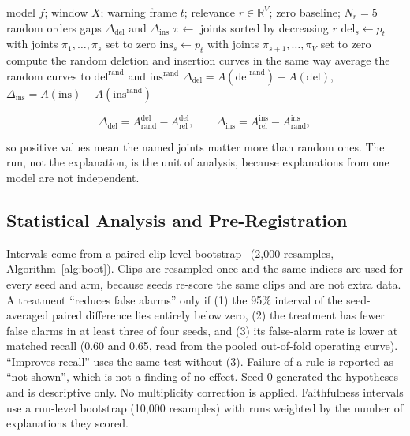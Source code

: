 \documentclass[journal]{IEEEtran}
\begin{document}
\begin{algorithm*}[!t]
\caption{Deletion and insertion faithfulness for one warning.}
\label{alg:faith}
\begin{algorithmic}[1]
\REQUIRE model $f$; window $X$; warning frame $t$; relevance $r \in \mathbb{R}^{V}$; zero baseline; $N_r = 5$ random orders
\ENSURE gaps $\Delta_{\mathrm{del}}$ and $\Delta_{\mathrm{ins}}$
\STATE $\pi \leftarrow$ joints sorted by decreasing $r$
\STATE $\mathrm{del}_s \leftarrow p_t$ with joints $\pi_1,\dots,\pi_s$ set to zero
\STATE $\mathrm{ins}_s \leftarrow p_t$ with joints $\pi_{s+1},\dots,\pi_V$ set to zero
\ENDFOR
{}
\STATE compute the random deletion and insertion curves in the same way
\ENDFOR
\STATE average the random curves to $\mathrm{del}^{\mathrm{rand}}$ and $\mathrm{ins}^{\mathrm{rand}}$
\RETURN $\Delta_{\mathrm{del}} = A(\mathrm{del}^{\mathrm{rand}}) - A(\mathrm{del})$, $\Delta_{\mathrm{ins}} = A(\mathrm{ins}) - A(\mathrm{ins}^{\mathrm{rand}})$
\end{algorithmic}
\end{algorithm*}

\begin{equation}
\label{eq:gaps}
\Delta_{\mathrm{del}} = A_{\mathrm{rand}}^{\mathrm{del}} - A_{\mathrm{rel}}^{\mathrm{del}},\qquad \Delta_{\mathrm{ins}} = A_{\mathrm{rel}}^{\mathrm{ins}} - A_{\mathrm{rand}}^{\mathrm{ins}},
\end{equation}


so positive values mean the named joints matter more than random ones. The run, not the explanation, is the unit of analysis, because explanations from one model are not independent.


\subsection{Statistical Analysis and Pre-Registration}\label{sub:stats}

Intervals come from a paired clip-level bootstrap~\cite{efron} (2,000 resamples, Algorithm~\ref{alg:boot}). Clips are resampled once and the same indices are used for every seed and arm, because seeds re-score the same clips and are not extra data. A treatment ``reduces false alarms'' only if (1) the 95\% interval of the seed-averaged paired difference lies entirely below zero, (2) the treatment has fewer false alarms in at least three of four seeds, and (3) its false-alarm rate is lower at matched recall (0.60 and 0.65, read from the pooled out-of-fold operating curve). ``Improves recall'' uses the same test without (3). Failure of a rule is reported as ``not shown'', which is not a finding of no effect. Seed 0 generated the hypotheses and is descriptive only. No multiplicity correction is applied. Faithfulness intervals use a run-level bootstrap (10,000 resamples) with runs weighted by the number of explanations they scored.
\end{document}
